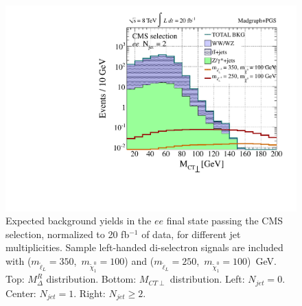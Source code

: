 \begin{figure}[ht]
\includegraphics[width=0.3\columnwidth]{fig/sectionIV/PDF_selectronL_CMS_MCTperp_ee_Njet2.pdf}
\caption{Expected background yields in the $ee$ final state passing the CMS selection, normalized to 20 fb$^{-1}$ of data, for different jet multiplicities. Sample left-handed di-selectron signals are included with ($m_{\tilde{\ell}_{L}} = 350$,~$m_{\tilde{\chi}_{1}^0} = 100$) and ($m_{\tilde{\ell}_{L}} = 250$,~$m_{\tilde{\chi}_{1}^0} = 100$)~GeV. Top: $M_{\Delta}^{R}$ distribution. Bottom: $M_{CT\perp}$ distribution. Left: $N_{jet} = 0$. Center: $N_{jet} = 1$. Right: $N_{jet} \ge 2$. \label{fig:EEPDF}}
\end{figure}

